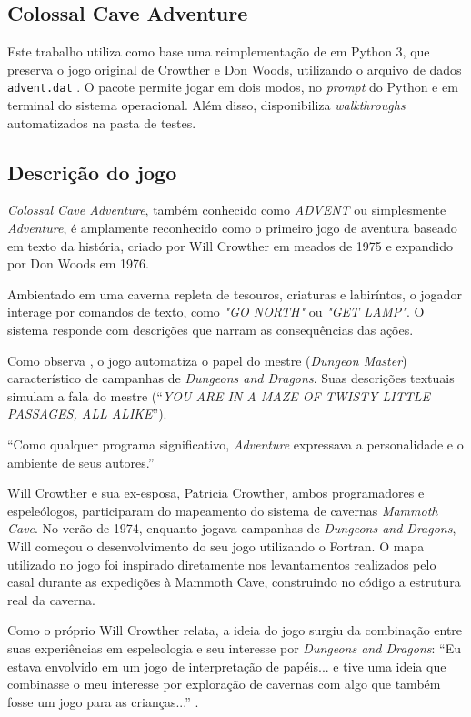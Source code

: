 \documentclass[12pt,a4paper]{article}
\begin{document}
\subsection{Colossal Cave Adventure}
Este trabalho utiliza como base uma reimplementação de \textcite{rhodes_adventure_py} em Python 3, que preserva o jogo original de Crowther e Don Woods, utilizando o arquivo de dados \texttt{advent.dat} \textcite{adventure_original_sources}. O pacote permite jogar em dois modos, no \emph{prompt} do Python e em terminal do sistema operacional. Além disso, disponibiliza \textit{walkthroughs} automatizados na pasta de testes.

\subsection{Descrição do jogo}

\textit{Colossal Cave Adventure}, também conhecido como \textit{ADVENT} ou simplesmente \textit{Adventure}, é amplamente reconhecido como o primeiro jogo de aventura baseado em texto da história, criado por Will Crowther em meados de 1975 e expandido por Don Woods em 1976. 

Ambientado em uma caverna repleta de tesouros, criaturas e labiríntos, o jogador interage por comandos de texto, como \textit{"GO NORTH"} ou \textit{"GET LAMP"}. O sistema responde com descrições que narram as consequências das ações.

Como observa \textcite{dibbell1998mytinylife}, o jogo automatiza o papel do mestre (\textit{Dungeon Master}) característico de campanhas de \textit{Dungeons and Dragons}. Suas descrições textuais simulam a fala do mestre (“\textit{YOU ARE IN A MAZE OF TWISTY LITTLE PASSAGES, ALL ALIKE}”).  

“Como qualquer programa significativo, \textit{Adventure} expressava a personalidade e o ambiente de seus autores.” \textcite{levy2010hackers}

Will Crowther e sua ex-esposa, Patricia Crowther, ambos programadores e espeleólogos, participaram do mapeamento do sistema de cavernas \textit{Mammoth Cave}. No verão de 1974, enquanto jogava campanhas de \textit{Dungeons and Dragons}, Will começou o desenvolvimento do seu jogo utilizando o Fortran. O mapa utilizado no jogo foi inspirado diretamente nos levantamentos realizados pelo casal durante as expedições à Mammoth Cave, construindo no código a estrutura real da caverna.

Como o próprio Will Crowther relata, a ideia do jogo surgiu da combinação entre suas experiências em espeleologia e seu interesse por \textit{Dungeons and Dragons}: “Eu estava envolvido em um jogo de interpretação de papéis... e tive uma ideia que combinasse o meu interesse por exploração de cavernas com algo que também fosse um jogo para as crianças...” \textcite{peterson1983genesis}.
\end{document}
